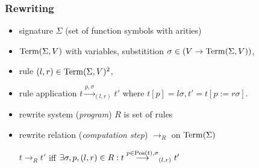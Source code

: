 \begin{frame}[fragile]
\frametitle{Rewriting}

  \begin{itemize}[<+->]
  \item signature $\Sigma$ (set of function symbols with arities)
  \item $\operatorname{Term}(\Sigma,V)$ with variables, 
    substitition $\sigma \in (V\to\operatorname{Term}(\Sigma,V))$,
  \item rule $(l,r)\in\operatorname{Term}(\Sigma,V)^2$,
  \item rule application 
    $t\stackrel{p,\sigma}{\longrightarrow}_{(l,r)} t'$ 
    where $t[p]=l\sigma, t'=t[p:=r\sigma]$.
  \item rewrite system (\emph{program}) $R$ is set of rules
  \item rewrite relation (\emph{computation step}) $\to_R$
    on $\operatorname{Term}(\Sigma)$

    $t\to_R t'$ iff $\exists \sigma,p,(l,r)\in R: 
    t\stackrel{p\in\operatorname{Pos}(t),\sigma}{\longrightarrow}_{(l,r)} t'$
  \end{itemize}

\end{frame}

